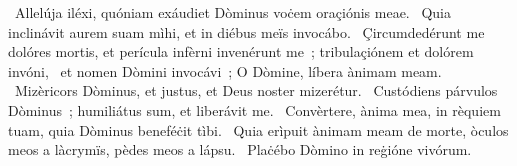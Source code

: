 {~Allelúja}
{%
iléxi, quóniam exáudiet Dòminus voċem oraçiónis meae.
~Quia inclinávit aurem suam mìhi, et in diébus meïs invocábo.
~Çircumdedérunt me dolóres mortis, et perícula infèrni invenérunt me~; tribulaçiónem et dolórem invóni,
~et nomen Dòmini invocávi~; O Dòmine, líbera ànimam meam.
~Mizèricors Dòminus, et justus, et Deus noster mizerétur.
~Custódiens párvulos Dòminus~; humiliátus sum, et liberávit me.
~Convèrtere, ànima mea, in rèquiem tuam, quia Dòminus beneféċit tìbi.
~Quia erìpuit ànimam meam de morte, òculos meos a làcrymïs, pèdes meos a lápsu.
~Plaċébo Dòmino in reġióne vivórum.}

